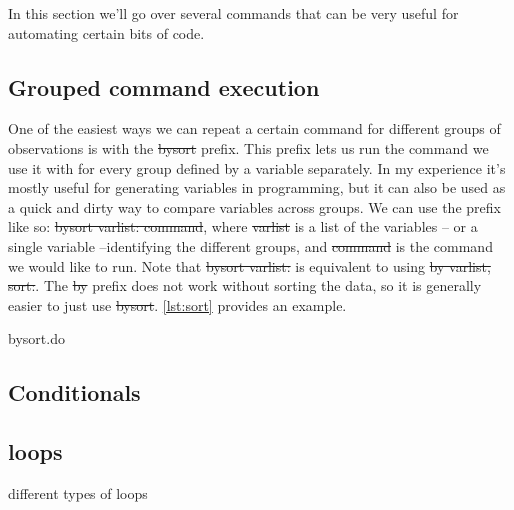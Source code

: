 
In this section we'll go over several commands that can be very useful for automating certain bits of code.

\subsection{Grouped command execution}
One of the easiest ways we can repeat a certain command for different groups of observations is with the \st{bysort} prefix.
This prefix lets us run the command we use it with for every group defined by a variable separately.
In my experience it's mostly useful for generating variables in programming,
but it can also be used as a quick and dirty way to compare variables across groups.
We can use the prefix like so: \st{bysort varlist: command},
where \st{varlist} is a list of the variables -- or a single variable --identifying the different groups,
and \st{command} is the command we would like to run.
Note that \st{bysort varlist:} is equivalent to using \st{by varlist, sort:}.
The \st{by} prefix does not work without sorting the data, so it is generally easier to just use \st{bysort}.
\cref{lst:sort} provides an example.

\begin{listing}[htp]
\caption{bysort.do}\label{lst:sort}
\end{listing}

\subsection{Conditionals}


\subsection{loops}

different types of loops

